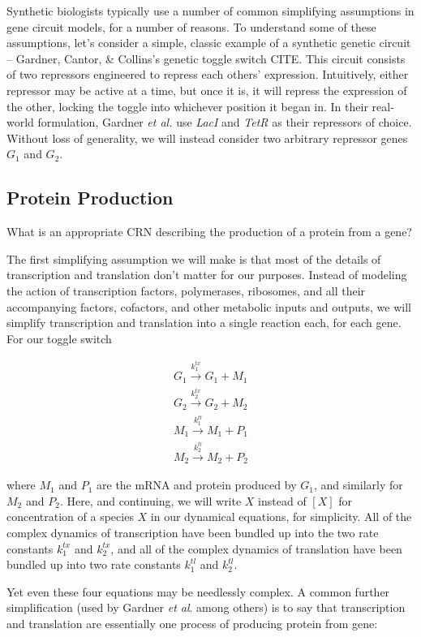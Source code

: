 \documentclass[preprint,12pt]{elsarticle}
\begin{document}
Synthetic biologists typically use a number of common simplifying assumptions in gene circuit models, for a number of reasons. To understand some of these assumptions, let's consider a simple, classic example of a synthetic genetic circuit -- Gardner, Cantor, \& Collins's genetic toggle switch {CITE}. This circuit consists of two repressors engineered to repress each others' expression. Intuitively, either repressor may be active at a time, but once it is, it will repress the expression of the other, locking the toggle into whichever position it began in. In their real-world formulation, Gardner \emph{et al.} use \emph{LacI} and \emph{TetR} as their repressors of choice. Without loss of generality, we will instead consider two arbitrary repressor genes $G_1$ and $G_2$. 

\subsection{Protein Production}

What is an appropriate CRN describing the production of a protein from a gene? 

The first simplifying assumption we will make is that most of the details of transcription and translation don't matter for our purposes. Instead of modeling the action of transcription factors, polymerases, ribosomes, and all their accompanying factors, cofactors, and other metabolic inputs and outputs, we will simplify transcription and translation into a single reaction each, for each gene. For our toggle switch

\begin{align}
	G_1 \xrightarrow{k_1^{tx}} G_1 + M_1\\
	G_2 \xrightarrow{k_2^{tx}} G_2 + M_2\\
	M_1 \xrightarrow{k_1^{tl}} M_1 + P_1\\
	M_2 \xrightarrow{k_2^{tl}} M_2 + P_2
\end{align}

where $M_1$ and $P_1$ are the mRNA and protein produced by $G_1$, and similarly for $M_2$ and $P_2$. Here, and continuing, we will write $X$ instead of $[X]$ for concentration of a species $X$ in our dynamical equations, for simplicity. All of the complex dynamics of transcription have been bundled up into the two rate constants $k_1^{tx}$ and $k_2^{tx}$, and all of the complex dynamics of translation have been bundled up into two rate constants $k_1^{tl}$ and $k_2^{tl}$. 

Yet even these four equations may be needlessly complex. A common further simplification (used by Gardner \emph{et al}. among others) is to say that transcription and translation are essentially one process of producing protein from gene:
\end{document}
